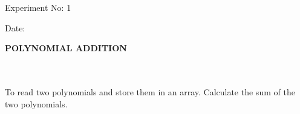 \documentclass{article}
\begin{document}
\begin{flushright}




    {\fontsize{12}{12}\selectfont \textmd 
    Experiment No: 1
    } \\



    \vspace{0.16cm}



    {\fontsize{12}{12}\selectfont \textmd 
    Date:  \hspace{2.08cm}
    }




\end{flushright}








\vspace{1.5cm}








\begin{center}




    {\fontsize{24}{28}\selectfont \bfseries 
     POLYNOMIAL ADDITION
    } \\



    
    \vspace{1.5cm}



    
\end{center}








\vspace{1.8cm}








 \\ \\
To read two polynomials and store them in an array. Calculate the sum of the two polynomials.
\end{document}

